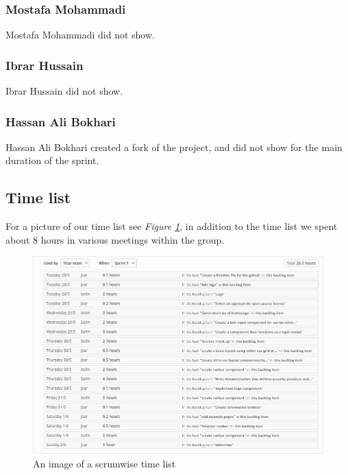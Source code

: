 \documentclass[12pt]{article}
\begin{document}
\subsubsection{Mostafa Mohammadi}
Mostafa Mohammadi did not show.
\subsubsection{Ibrar Hussain}
Ibrar Hussain did not show.
\subsubsection{Hassan Ali Bokhari}
Hassan Ali Bokhari created a fork of the project, and did not show for the main duration of the sprint.

\subsection{Time list}

For a picture of our time list see \textit{Figure \ref{fig:TL}}, in addition to the time list we spent about 8 hours in various meetings within the group.
\begin{figure}[h]
    \begin{adjustwidth}{-1in}{-1in}
        \centering
        \includegraphics[scale=0.5]{timelist.png}
        \caption{An image of a scrumwise time list}
        \label{fig:TL}
    \end{adjustwidth}
\end{figure}
\clearpage
\end{document}
